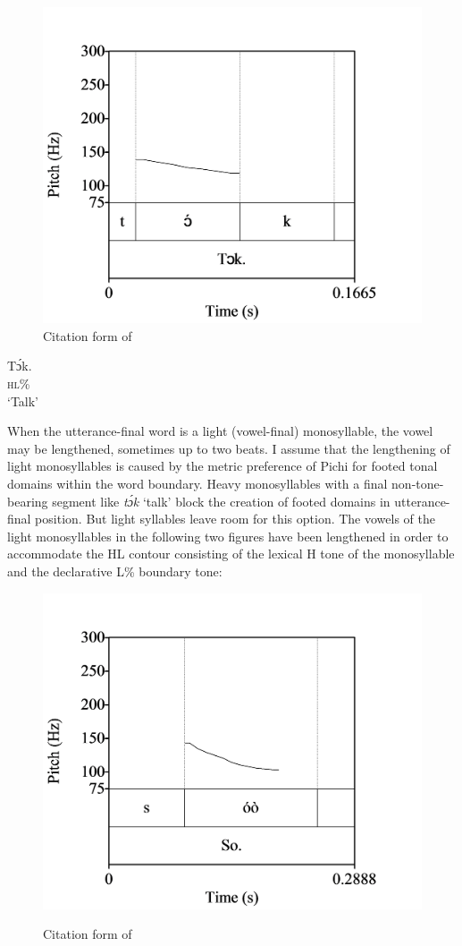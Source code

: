 \begin{figure}
	\caption{Citation form of }
	\label{fig:key:3.2}
	\includegraphics[width=.44\textwidth]{figures/yakpomod-img4.png}
\end{figure}
\ea\label{ex:key:44}
\gll Tɔ́k.\\
\textsc{hl\%}\\
\glt ‘Talk’
\z

When the utterance-final word is a light (vowel-final) monosyllable, the vowel may be lengthened, sometimes up to two beats. I assume that the lengthening of light monosyllables is caused by the metric preference of Pichi for footed tonal domains within the word boundary. Heavy monosyllables with a final non-tone-bearing segment like \textit{tɔ́k} ‘talk’ block the creation of footed domains in utterance-final position. But light syllables leave room for this option. The vowels of the light monosyllables in the following two figures have been lengthened in order to accommodate the HL contour consisting of the lexical H tone of the monosyllable and the declarative L\% boundary tone: 

\begin{figure}
\caption{Citation form of }
\includegraphics[height=.3\textheight]{figures/yakpomod-img5.png}
\label{fig:key:3.3}
\end{figure}

